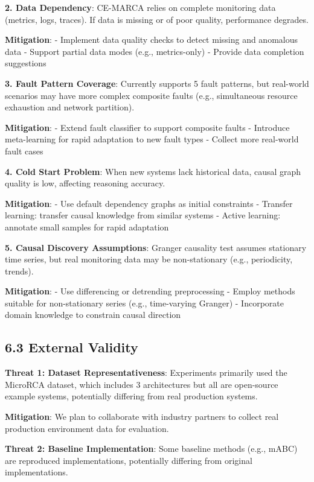 \textbf{2. Data Dependency}: CE-MARCA relies on complete monitoring data
(metrics, logs, traces). If data is missing or of poor quality,
performance degrades.

\textbf{Mitigation}: - Implement data quality checks to detect missing
and anomalous data - Support partial data modes (e.g., metrics-only) -
Provide data completion suggestions

\textbf{3. Fault Pattern Coverage}: Currently supports 5 fault patterns,
but real-world scenarios may have more complex composite faults (e.g.,
simultaneous resource exhaustion and network partition).

\textbf{Mitigation}: - Extend fault classifier to support composite
faults - Introduce meta-learning for rapid adaptation to new fault types
- Collect more real-world fault cases

\textbf{4. Cold Start Problem}: When new systems lack historical data,
causal graph quality is low, affecting reasoning accuracy.

\textbf{Mitigation}: - Use default dependency graphs as initial
constraints - Transfer learning: transfer causal knowledge from similar
systems - Active learning: annotate small samples for rapid adaptation

\textbf{5. Causal Discovery Assumptions}: Granger causality test assumes
stationary time series, but real monitoring data may be non-stationary
(e.g., periodicity, trends).

\textbf{Mitigation}: - Use differencing or detrending preprocessing -
Employ methods suitable for non-stationary series (e.g., time-varying
Granger) - Incorporate domain knowledge to constrain causal direction

\hypertarget{external-validity}{%
\subsection{6.3 External Validity}\label{external-validity}}

\textbf{Threat 1: Dataset Representativeness}: Experiments primarily
used the MicroRCA dataset, which includes 3 architectures but all are
open-source example systems, potentially differing from real production
systems.

\textbf{Mitigation}: We plan to collaborate with industry partners to
collect real production environment data for evaluation.

\textbf{Threat 2: Baseline Implementation}: Some baseline methods (e.g.,
mABC) are reproduced implementations, potentially differing from
original implementations.

